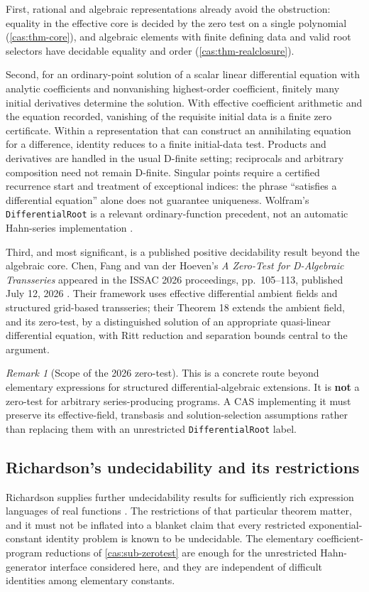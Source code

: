 \documentclass[11pt,letterpaper]{article}
\numberwithin{equation}{section}
\theoremstyle{definition}
\theoremstyle{remark}
\newtheorem{remark}[theorem]{Remark}
\begin{document}
First, rational and algebraic representations already avoid the obstruction:
equality in the effective core is decided by the zero test on a single
polynomial (\cref{cas:thm-core}), and algebraic elements with finite defining
data and valid root selectors have decidable equality and order
(\cref{cas:thm-realclosure}).

Second, for an ordinary-point solution of a scalar linear differential equation
with analytic coefficients and nonvanishing highest-order coefficient, finitely
many initial derivatives determine the solution. With effective coefficient
arithmetic and the equation recorded, vanishing of the requisite initial data is
a finite zero certificate. Within a representation that can construct an
annihilating equation for a difference, identity reduces to a finite
initial-data test. Products and derivatives are handled in the usual D-finite
setting; reciprocals and arbitrary composition need not remain D-finite.
Singular points require a certified recurrence start and treatment of
exceptional indices: the phrase ``satisfies a differential equation'' alone does
not guarantee uniqueness. Wolfram's \texttt{DifferentialRoot} is a relevant
ordinary-function precedent, not an automatic Hahn-series implementation
\cite{cas:WLDifferentialRoot}.

Third, and most significant, is a published positive decidability result beyond
the algebraic core. Chen, Fang and van der Hoeven's \emph{A Zero-Test for
D-Algebraic Transseries} appeared in the ISSAC 2026 proceedings,
pp.~105--113, published July 12, 2026 \cite{cas:CFH}. Their framework uses
effective differential ambient fields and structured grid-based transseries;
their Theorem 18 extends the ambient field, and its zero-test, by a
distinguished solution of an appropriate quasi-linear differential equation,
with Ritt reduction and separation bounds central to the argument.

\begin{remark}[Scope of the 2026 zero-test]\label{cas:rem-cfh}
This is a concrete route beyond elementary expressions for structured
differential-algebraic extensions. It is \textbf{not} a zero-test for arbitrary
series-producing programs. A CAS implementing it must preserve its
effective-field, transbasis and solution-selection assumptions rather than
replacing them with an unrestricted \texttt{DifferentialRoot} label.
\end{remark}

\subsection{Richardson's undecidability and its restrictions}
\label{cas:sub-richardson}
Richardson supplies further undecidability results for sufficiently rich
expression languages of real functions \cite{cas:Richardson}. The restrictions
of that particular theorem matter, and it must not be inflated into a blanket
claim that every restricted exponential-constant identity problem is known to be
undecidable. The elementary coefficient-program reductions of
\cref{cas:sub-zerotest} are enough for the unrestricted Hahn-generator
interface considered here, and they are independent of difficult identities
among elementary constants.
\end{document}
